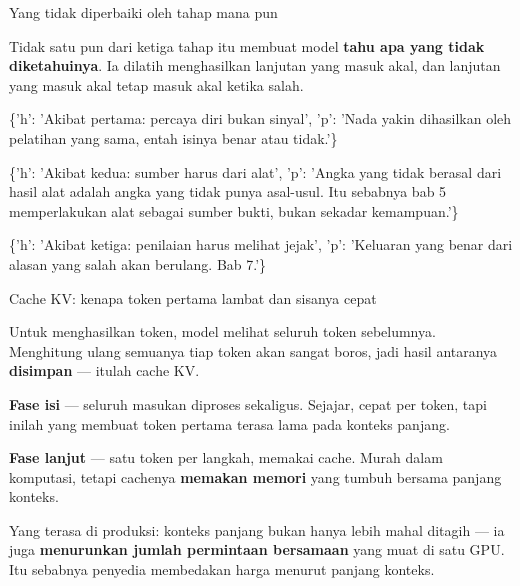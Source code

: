 \documentclass[aspectratio=169,11pt,t]{beamer}
\begin{document}
\begin{frame}[shrink=25]{Yang tidak diperbaiki oleh tahap mana pun}
{\fontsize{9.4}{12.6}\selectfont\color{fg2}Tidak satu pun dari ketiga tahap itu membuat model \textbf{tahu apa yang tidak diketahuinya}. Ia dilatih menghasilkan lanjutan yang masuk akal, dan lanjutan yang masuk akal tetap masuk akal ketika salah.\par}\vskip 4pt
\begin{isteps}
\item \{'h': 'Akibat pertama: percaya diri bukan sinyal', 'p': 'Nada yakin dihasilkan oleh pelatihan yang sama, entah isinya benar atau tidak.'\}
\item \{'h': 'Akibat kedua: sumber harus dari alat', 'p': 'Angka yang tidak berasal dari hasil alat adalah angka yang tidak punya asal-usul. Itu sebabnya bab 5 memperlakukan alat sebagai sumber bukti, bukan sekadar kemampuan.'\}
\item \{'h': 'Akibat ketiga: penilaian harus melihat jejak', 'p': 'Keluaran yang benar dari alasan yang salah akan berulang. Bab 7.'\}
\end{isteps}
\end{frame}


\begin{frame}[shrink=25]{Cache KV: kenapa token pertama lambat dan sisanya cepat}
{\fontsize{9.4}{12.6}\selectfont\color{fg2}Untuk menghasilkan token, model melihat seluruh token sebelumnya. Menghitung ulang semuanya tiap token akan sangat boros, jadi hasil antaranya \textbf{disimpan} --- itulah cache KV.\par}\vskip 4pt
\begin{minipage}[t]{0.485\textwidth}
{\fontsize{9.4}{12.6}\selectfont\color{fg2}\textbf{Fase isi} --- seluruh masukan diproses sekaligus. Sejajar, cepat per token, tapi inilah yang membuat token pertama terasa lama pada konteks panjang.\par}\vskip 4pt

\end{minipage}%
\hfill
\begin{minipage}[t]{0.485\textwidth}
{\fontsize{9.4}{12.6}\selectfont\color{fg2}\textbf{Fase lanjut} --- satu token per langkah, memakai cache. Murah dalam komputasi, tetapi cachenya \textbf{memakan memori} yang tumbuh bersama panjang konteks.\par}\vskip 4pt

\end{minipage}%
\begin{iband}[signal]
Yang terasa di produksi: konteks panjang bukan hanya lebih mahal ditagih --- ia juga \textbf{menurunkan jumlah permintaan bersamaan} yang muat di satu GPU. Itu sebabnya penyedia membedakan harga menurut panjang konteks.
\end{iband}
\end{frame}
\end{document}
